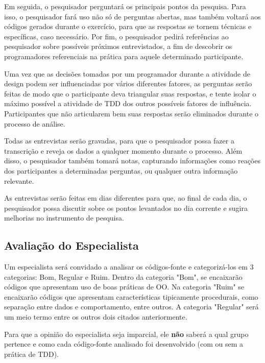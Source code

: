 Em seguida, o pesquisador perguntará os principais pontos da pesquisa.
Para isso, o pesquisador fará uso não só de perguntas abertas, mas também
voltará aos códigos gerados durante o exercício, para que as respostas se tornem técnicas e
específicas, caso necessário. 
Por fim, o pesquisador pedirá referências ao pesquisador sobre
possíveis próximos entrevistados, a fim de descobrir os programadores referenciais 
na prática para aquele determinado participante.

Uma vez que as decisões tomadas por um programador durante a atividade de design
podem ser influenciadas por vários diferentes fatores, 
as perguntas serão feitas de modo que o participante deva triangular suas respostas,
e tente isolar o máximo possível a atividade de TDD dos outros possíveis fatores
de influência. Participantes que não articularem bem suas respostas serão eliminados
durante o processo de análise.

Todas as entrevistas serão gravadas, para que o pesquisador possa fazer a
transcrição e reveja os dados a qualquer momento durante o processo. Além disso,
o pesquisador também tomará notas, capturando informações como reações dos 
participantes a determinadas perguntas, ou qualquer outra informação relevante. 

As entrevistas serão feitas em dias diferentes para que, ao final
de cada dia, o pesquisador possa discutir sobre os pontos levantados no dia
corrente e sugira melhorias no instrumento de pesquisa. 

\subsection{Avaliação do Especialista}
\label{sec:planejamento-especialista}

Um especialista será convidado a analisar os códigos-fonte e categorizá-los
em 3 categorias: Bom, Regular e Ruim. Dentro da categoria "Bom", se encaixarão códigos 
que apresentam uso de boas práticas de OO. Na categoria "Ruim" se encaixarão códigos
que apresentam características tipicamente procedurais, como separação entre
dados e comportamento, entre outros. A categoria "Regular" será um meio termo entre
os outros dois citados anteriormente.

Para que a opinião do especialista seja imparcial, ele \textbf{não} saberá a qual grupo
pertence e como cada código-fonte analisado foi desenvolvido (com ou sem a prática de TDD).

